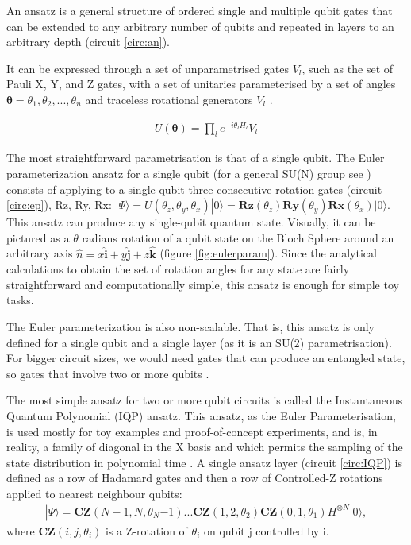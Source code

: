An ansatz is a general structure of ordered single and multiple qubit gates that can be extended to any arbitrary number of qubits and repeated in layers to an arbitrary depth (circuit \ref{circ:an}).

It can be expressed through a set of unparametrised gates ${V_l}$, such as the set of Pauli X, Y, and Z gates, with a set of unitaries parameterised by a set of angles $\boldsymbol{\theta}={\theta_1,\theta_2,...,\theta_n}$ and traceless rotational generators $V_l$ \cite{leone_practical_2024}.

\begin{align} \label{eq:genansatz}
    U(\mathbf{\theta})=\prod_l e^{-i\theta_l H_l} V_l
\end{align}



The most straightforward parametrisation is that of a single qubit. The Euler parameterization ansatz for a single qubit (for a general SU(N) group see \cite{tilma_generalized_2002}) consists of applying to a single qubit \cite{tilma_applications_2003} three consecutive rotation gates (circuit \ref{circ:ep}), Rz, Ry, Rx: $|\Psi \rangle = U(\theta_z,\theta_y,\theta_x)|0\rangle = \textbf{Rz}(\theta_z)\textbf{Ry}(\theta_y)\textbf{Rx}(\theta_x)|0 \rangle$. This ansatz can produce any single-qubit quantum state. Visually, it can be pictured as a $\theta$ radians rotation of a qubit state on the Bloch Sphere around an arbitrary axis $\hat{n} =x \hat{\textbf{i}}+y\hat{ \textbf{j}}+z\hat{ \textbf{k}}$ (figure \ref{fig:eulerparam}). Since the analytical calculations to obtain the set of rotation angles for any state are fairly straightforward and computationally simple, this ansatz is enough for simple toy tasks. 





The Euler parameterization is also non-scalable. That is, this ansatz is only defined for a single qubit and a single layer (as it is an SU(2) parametrisation). For bigger circuit sizes, we would need gates that can produce an entangled state, so gates that involve two or more qubits \cite{nielsen_quantum_2012}.

The most simple ansatz for two or more qubit circuits is called the Instantaneous Quantum Polynomial (IQP) ansatz. This ansatz, as the Euler Parameterisation, is used mostly for toy examples and proof-of-concept experiments, and is, in reality, a family of \mya diagonal in the X basis and which permits the sampling of the state distribution in polynomial time \cite{bremner_average-case_2016}. A single ansatz layer (circuit \ref{circ:IQP}) is defined as a row of Hadamard gates and then a row of Controlled-Z rotations applied to nearest neighbour qubits:
\begin{align} \label{IQP}
    | \Psi \rangle = \textbf{CZ}(N-1,N,\theta_N{-1})...\textbf{CZ}(1,2,\theta_2) \textbf{CZ}(0,1,\theta_1) H^{\otimes N}|0 \rangle,
\end{align}
where $\textbf{CZ}(i,j,\theta_i)$ is a Z-rotation of $\theta_i$ on qubit j controlled by i.

